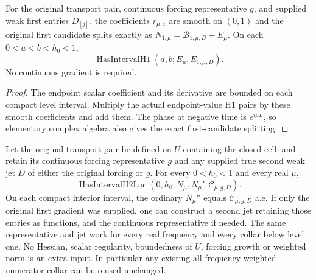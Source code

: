 \begin{lemma}
\label{lem:numerator-endpoint-flux-derivative}
\leanok
For the original transport pair, continuous forcing representative $g$,
and supplied weak first entries $D_{[j]}$, the coefficients $r_{\mu,\varepsilon}$
are smooth on $(0,1)$ and the original first candidate splits exactly as
$N_{1,\mu}=\mathcal B_{1,\mu,D}+E_\mu$.
On each $0<a<b<h_0<1$,
\[
 \operatorname{HasIntervalH1}(a,b;E_\mu,E_{1,\mu,D}).
\]
No continuous gradient is required.
\end{lemma}

\begin{proof}
\leanok
The endpoint scalar coefficient and its derivative are bounded on each
compact level interval. Multiply the actual endpoint-value H1 pairs by
these smooth coefficients and add them.
The phase at negative time is $e^{i\mu L}$, so elementary complex algebra
also gives the exact first-candidate splitting.
\end{proof}

\begin{lemma}
\label{lem:numerator-second-moving-endpoints}
\leanok
Let the original transport pair be defined on $U$ containing the closed cell,
and retain its continuous forcing representative $g$ and any supplied true
second weak jet $D$ of either the original forcing or $g$.
For every $0<h_0<1$ and every real $\mu$,
\[
 \operatorname{HasIntervalH2Loc}
   (0,h_0;N_\mu,N_\mu',\mathcal C_{\mu,g,D}).
\]
On each compact interior interval, the ordinary $N_\mu''$ equals
$\mathcal C_{\mu,g,D}$ a.e.
If only the original first gradient was supplied, one can construct a second
jet retaining those entries as functions, and the continuous representative
if needed. The same representative and jet work for every real frequency
and every collar below level one.
No Hessian, scalar regularity, boundedness of $U$, forcing growth or weighted
norm is an extra input. In particular any existing all-frequency weighted
numerator collar can be reused unchanged.
\end{lemma}

